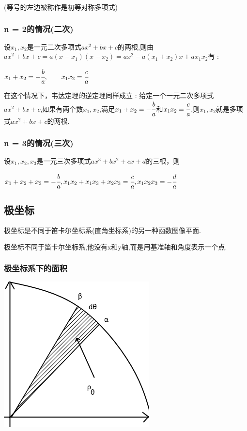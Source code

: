 \documentclass[UTF8,12pt]{ctexbook}
\begin{document}
{{{{(等号的左边被称作是初等对称多项式)
}%

\subsubsection{n = 2的情况(二次)}{
  设$x_1,x_2$是一元二次多项式$ax^2 + bx + c$的两根,则由$ax^2 +bx + c = a(x - x_1)(x - x_2) = ax^2 - a(x_1 + x_2)x + ax_1x_2$有 :

  $x_1 + x_2 = -\cfrac{b}{a},\qquad x_1x_2 = \cfrac{c}{a}$

  在这个情况下，韦达定理的逆定理同样成立 : 给定一个一元二次多项式$ax^2 + bx + c$,如果有两个数$x_1,x_2$,满足$x_1 + x_2 = -\cfrac{b}{a}$和$x_1x_2 = \cfrac{c}{a}$,则$x_1,x_2$就是多项式$ax^2 + bx + c$的两根.
}%

\subsubsection{n = 3的情况(三次)}{
  设$x_1,x_2,x_3$是一元三次多项式$ax^3 + bx^2 + cx + d$的三根，则

  $x_1 + x_2 + x_3 = -\cfrac{b}{a}, x_1x_2 + x_1x_3 + x_2x_3 = \cfrac{c}{a},x_1x_2x_3 = -\cfrac{d}{a}$
}%

}%

\subsection{极坐标}{
极坐标是不同于笛卡尔坐标系(直角坐标系)的另一种函数图像平面.

极坐标不同于笛卡尔坐标系,他没有x和y轴,而是用基准轴和角度表示一个点.

\subsubsection{极坐标系下的面积}{
  \includegraphics{resources/polar_coordness.png}

}}}}
\end{document}
